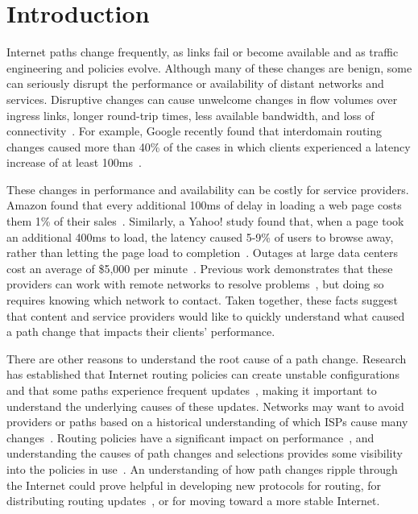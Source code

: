 \section{Introduction}

Internet paths change frequently, as links fail or become available and as traffic engineering and policies evolve.
Although many of these changes are benign, some can seriously disrupt the performance or availability of distant networks and services. Disruptive changes can cause unwelcome changes in flow 
volumes over ingress links, longer round-trip times, less available bandwidth, and loss of 
connectivity~\cite{needle, hubble}. For example, Google recently
found that interdomain routing changes caused more than 40\% of the cases 
in which clients experienced a latency increase of at least 100ms~\cite{latlong}.

These changes in performance and availability can be costly for service providers.  
 Amazon found that every additional 100ms of delay in loading a
web page costs them 1\% of their sales~\cite{linden-amazon}.  Similarly, a Yahoo! study
found that, when a page took an additional 400ms to load, the latency caused
5-9\% of users to browse away, rather than letting the page load to
completion~\cite{yahoo-slow}. Outages at large data centers cost an average of \$5,000 per minute~\cite{ponemon}. Previous work demonstrates that these providers can work with remote networks to resolve problems~\cite{google-whyhigh}, but doing so requires knowing which network to contact. Taken together, these facts 
suggest that content and service providers 
would like to quickly understand what caused a path change that impacts their clients' performance.


There are other reasons to understand the root cause of a path change. Research has established that Internet routing policies can create unstable configurations~\cite{wedgies, griffin-wilfgong-sheperd} and that some paths experience frequent updates~\cite{labovitz-instability}, making it important to understand the underlying causes of these updates. Networks may want to avoid providers or paths based on a historical understanding of which ISPs cause many changes~\cite{caesar}.  
Routing policies have a significant impact on performance~\cite{path-inflation}, and understanding the causes of path changes and selections provides some visibility into the policies in use~\cite{iplane-nano}. An understanding of how path changes ripple through the Internet could prove helpful in developing new protocols for routing, for distributing routing updates~\cite{loup}, or for moving toward a more stable Internet.



